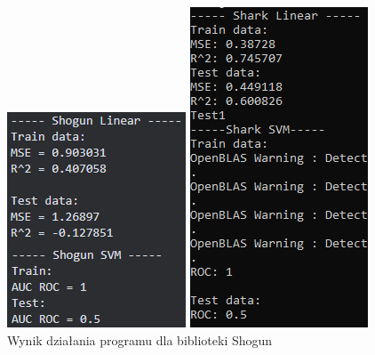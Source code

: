 \begin{figure}[!ht]
	\centering
	\begin{minipage}{0.31\textwidth}
		\centering
		\includegraphics[width=0.8\linewidth]{Rozdzial7/shogun}
		\caption{Wynik działania programu dla biblioteki Shogun}
		\label{fig:shogun_linear_svm}		
	\end{minipage}%
    \hspace{0.02\textwidth}
	\begin{minipage}{0.31\textwidth}
		\centering
		\includegraphics[width=0.7\linewidth]{Rozdzial7/shark}

\end{minipage}
\end{figure}
